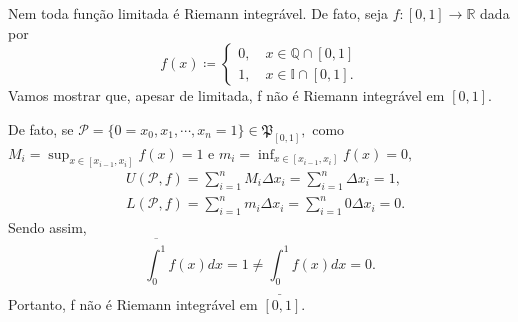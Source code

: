 \documentclass[Analysis/analysis_notes.tex]{subfiles}
\begin{document}
\begin{example}
  Nem toda fun\c cão limitada é Riemann integrável. De fato, seja \(f:[0, 1]\rightarrow \mathbb{R}\) dada por 
    \[
      f(x) \coloneqq  \left\{\begin{array}{ll}
          0,\quad x\in \mathbb{Q}\cap{[0, 1]}\\
          1,\quad x\in \mathbb{I}\cap{[0, 1]}.
        \end{array}\right.
    \]
    Vamos mostrar que, apesar de limitada, f não é Riemann integrável em \([0, 1].\)

  De fato, se \(\mathcal{P} = \{0 = x_{0}, x_{1}, \cdots, x_{n} = 1\}\in \mathfrak{P}_{[0, 1]},\) como \(M_{i}=\sup_{x\in[x_{i-1}, x_{i}]} f(x) = 1\)
  e \(m_{i} = \inf_{x\in[x_{i-1}, x_{i}]}f(x) = 0,\) 
 \begin{align*}
   &U(\mathcal{P}, f) = \sum\limits_{i=1}^{n}M_{i}\Delta x_{i} = \sum\limits_{i=1}^{n}\Delta x_{i} =1,\\
   &L(\mathcal{P}, f) = \sum\limits_{i=1}^{n}m_{i}\Delta x_{i} = \sum\limits_{i=1}^{n}0\Delta x_{i} = 0.
 \end{align*}
 Sendo assim, 
   \[
     \overline{\int_{0}^{1}}f(x)dx = 1\neq \underline{\int_{0}^{1}}f(x)dx = 0.
   \]
   Portanto, f não é Riemann integrável em \([0, 1].\)
  \end{example}
\end{document}
